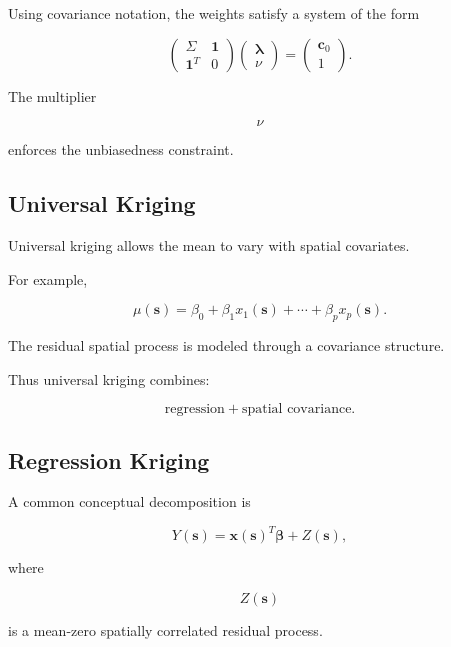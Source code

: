 Using covariance notation, the weights satisfy a system of the form

\[
\boxed{
\begin{pmatrix}
\Sigma
&
\mathbf{1}
\\
\mathbf{1}^T
&
0
\end{pmatrix}
\begin{pmatrix}
\boldsymbol{\lambda}\\
\nu
\end{pmatrix}
=
\begin{pmatrix}
\mathbf{c}_0\\
1
\end{pmatrix}.
}
\]

The multiplier

\[
\nu
\]

enforces the unbiasedness constraint.

\subsection{Universal Kriging}
\label{subsec:universal-kriging}

Universal kriging allows the mean to vary with spatial covariates.

For example,

\[
\boxed{
\mu(\mathbf{s})
=
\beta_0
+
\beta_1x_1(\mathbf{s})
+
\cdots
+
\beta_px_p(\mathbf{s}).
}
\]

The residual spatial process is modeled through a covariance structure.

Thus universal kriging combines:

\[
\boxed{
\text{regression}
+
\text{spatial covariance}.
}
\]

\subsection{Regression Kriging}
\label{subsec:regression-kriging}

A common conceptual decomposition is

\[
\boxed{
Y(\mathbf{s})
=
\mathbf{x}(\mathbf{s})^T
\boldsymbol{\beta}
+
Z(\mathbf{s}),
}
\]

where

\[
Z(\mathbf{s})
\]

is a mean-zero spatially correlated residual process.

